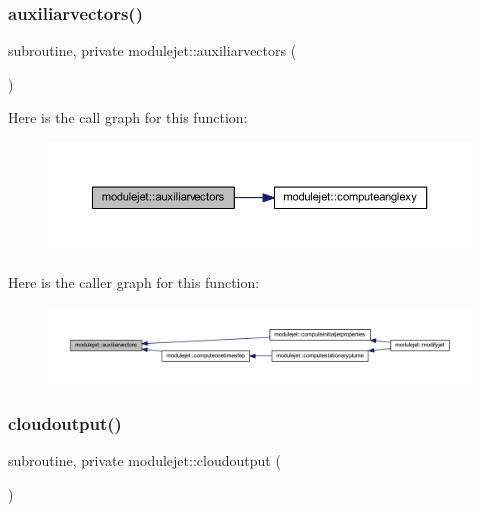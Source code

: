 \subsubsection{\texorpdfstring{auxiliarvectors()}{auxiliarvectors()}}
{\footnotesize\ttfamily subroutine, private modulejet\+::auxiliarvectors (\begin{DoxyParamCaption}{ }\end{DoxyParamCaption})\hspace{0.3cm}{\ttfamily [private]}}

Here is the call graph for this function\+:\nopagebreak
\begin{figure}[H]
\begin{center}
\leavevmode
\includegraphics[width=350pt]{namespacemodulejet_a188ea99d96436b044d3ea76f4ddfa467_cgraph}
\end{center}
\end{figure}
Here is the caller graph for this function\+:\nopagebreak
\begin{figure}[H]
\begin{center}
\leavevmode
\includegraphics[width=350pt]{namespacemodulejet_a188ea99d96436b044d3ea76f4ddfa467_icgraph}
\end{center}
\end{figure}
\mbox{\label{namespacemodulejet_a61dad6f878bf6cce690b9523901012ac}} 
\subsubsection{\texorpdfstring{cloudoutput()}{cloudoutput()}}
{\footnotesize\ttfamily subroutine, private modulejet\+::cloudoutput (\begin{DoxyParamCaption}{ }\end{DoxyParamCaption})\hspace{0.3cm}{\ttfamily [private]}}

